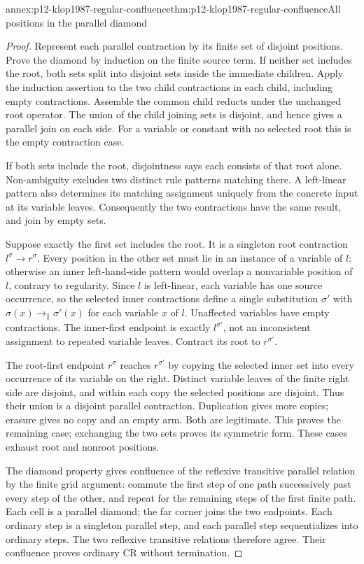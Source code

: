 \begin{annexitem}{annex:p12-klop1987-regular-confluence}{thm:p12-klop1987-regular-confluence}{All positions in the parallel diamond}
\begin{proof}
Represent each parallel contraction by its finite set of disjoint
positions. Prove the diamond by induction on the finite source term.
If neither set includes the root, both sets split into disjoint sets
inside the immediate children. Apply the induction assertion to the
two child contractions in each child, including empty contractions.
Assemble the common child reducts under the unchanged root operator.
The union of the child joining sets is disjoint, and hence gives a
parallel join on each side. For a variable or constant with no selected
root this is the empty contraction case.

If both sets include the root, disjointness says each consists of that
root alone. Non-ambiguity excludes two distinct rule patterns matching
there. A left-linear pattern also determines its matching assignment
uniquely from the concrete input at its variable leaves. Consequently
the two contractions have the same result, and join by empty sets.

Suppose exactly the first set includes the root. It is a singleton root
contraction \(l^\sigma\to r^\sigma\). Every position in the other
set must lie in an instance of a variable of \(l\): otherwise an inner
left-hand-side pattern would overlap a nonvariable position of \(l\),
contrary to regularity. Since \(l\) is left-linear, each variable has
one source occurrence, so the selected inner contractions define a
single substitution \(\sigma'\) with
\(\sigma(x)\to_{\parallel}\sigma'(x)\) for each variable
\(x\) of \(l\). Unaffected variables have empty contractions.
The inner-first endpoint is exactly \(l^{\sigma'}\), not an
inconsistent assignment to repeated variable leaves. Contract its root
to \(r^{\sigma'}\).

The root-first endpoint \(r^\sigma\) reaches \(r^{\sigma'}\)
by copying the selected inner set into every occurrence of its variable
on the right. Distinct variable leaves of the finite right side are
disjoint, and within each copy the selected positions are disjoint.
Thus their union is a disjoint parallel contraction. Duplication gives
more copies; erasure gives no copy and an empty arm. Both are legitimate.
This proves the remaining case; exchanging the two sets proves its
symmetric form. These cases exhaust root and nonroot positions.

The diamond property gives confluence of the reflexive transitive
parallel relation by the finite grid argument: commute the first step
of one path successively past every step of the other, and repeat for
the remaining steps of the first finite path. Each cell is a parallel
diamond; the far corner joins the two endpoints. Each ordinary step is
a singleton parallel step, and each parallel step sequentializes into
ordinary steps. The two reflexive transitive relations therefore agree.
Their confluence proves ordinary CR without termination.
\end{proof}
\end{annexitem}

